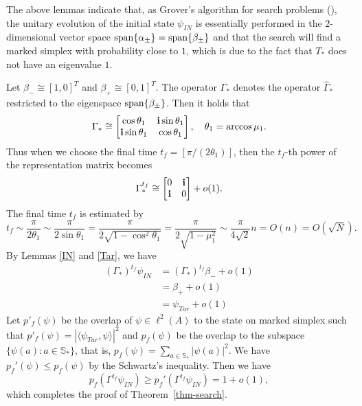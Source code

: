 \documentclass[a4paper,12pt]{article}
\newcommand{\bs}[1]{\boldsymbol{#1}}
\newcommand{\im}{\bs{\rm i}}
\newcommand{\spann}{{\rm span}}
\newcommand{\bra}{\langle}
\newcommand{\ket}{\rangle}
\numberwithin{equation}{section}
\begin{document}
The above lemmas indicate that, as Grover's algorithm for search problems (\cite{P2013}), the unitary evolution of the initial state $\psi_{IN}$ is essentially performed in the $2$-dimensional vector space $\spann \{\alpha_\pm \} = \spann \{\beta_\pm \}$ and that the search will find a marked simplex with probability close to $1$, which is due to the fact that $T_\ast$ does not have an eigenvalue $1$.
\par
\bigskip
%
Let $\beta_-\cong [1,0]^T$ and $\beta_+\cong [0,1]^T$.
The operator $\Gamma_\ast$ denotes the operator $\hat \Gamma_\ast$ restricted to the eigenspace $\spann\{\beta_\pm\}$.
Then it holds that
	\[ \Gamma_\ast \cong \begin{bmatrix} \cos\theta_1 & \im \sin\theta_1 \\ \im \sin\theta_1 & \cos\theta_1 \end{bmatrix}, \quad \theta_1 = \arccos \mu_1. \]
Thus when we choose the final time $t_f=[\pi/(2\theta_1)]$, then the $t_f$-th power of the representation matrix becomes 
	\[ \Gamma_\ast^{t_f} \cong \begin{bmatrix} 0 & \im \\ \im  & 0 \end{bmatrix}+o(1). \]
The final time $t_f$ is estimated by 
\begin{equation}
\label{time} 
        t_f\sim \frac{\pi}{2\theta_1} \sim \frac{\pi}{2\sin\theta_1} = \frac{\pi}{2\sqrt{1-\cos^2\theta_1}} = \frac{\pi}{2\sqrt{1-\mu_1^2}} \sim \frac{\pi}{4\sqrt{2}}n=O(n)=O(\sqrt{N}). 
\end{equation}
By Lemmas \ref{IN} and \ref{Tar}, we have 
	\begin{align*}
        (\Gamma_\ast)^{t_f} \psi_{IN} &= (\Gamma_\ast)^{t_f} \beta_- +o(1) \\
        &= \beta_+ +o(1) \\
        &= \psi_{Tar}+o(1)
        \end{align*}
Let $p'_f(\psi)$ be the overlap of $\psi\in \ell^2(A)$ to the state on marked simplex such that $p'_f(\psi)=|\bra \psi_{Tar}, \psi \ket|^2$ 
and $p_f(\psi)$ be the overlap to the subspace $\{\psi(a):a\in \mathbb{S}_\ast \}$, that is, $p_f(\psi)=\sum_{a\in \mathbb{S}_\ast}|\psi(a)|^2$.
We have $p_f'(\psi)\leq p_f(\psi)$ by the Schwartz's inequality. 
Then we have 
	\[ p_f(\Gamma^{t_f}\psi_{IN})\geq p_f'(\Gamma^{t_f}\psi_{IN})=1+o(1), \]
which completes the proof of Theorem~\ref{thm-search}. 
\end{document}

